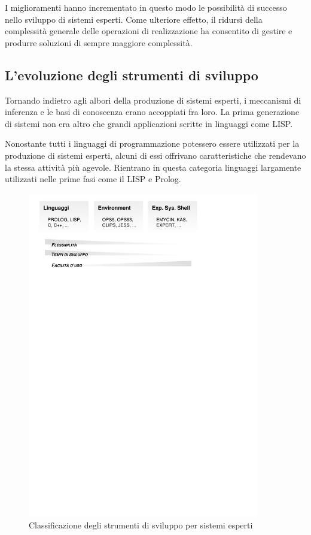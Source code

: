 I miglioramenti hanno incrementato in questo modo le possibilità di successo nello sviluppo di sistemi esperti. Come ulteriore effetto, il ridursi della complessità generale delle operazioni di realizzazione ha consentito di gestire e produrre soluzioni di sempre maggiore complessità.

\subsection{L'evoluzione degli strumenti di sviluppo}

Tornando indietro agli albori della produzione di sistemi esperti, i meccanismi di inferenza e le basi di conoscenza erano accoppiati fra loro. La prima generazione di sistemi non era altro che grandi applicazioni scritte in linguaggi come LISP.~\cite{knowbel1993} 

Nonostante tutti i linguaggi di programmazione potessero essere utilizzati per la produzione di sistemi esperti, alcuni di essi offrivano caratteristiche che rendevano la stessa attività più agevole. Rientrano in questa categoria linguaggi largamente utilizzati nelle prime fasi come il LISP e Prolog. 

\begin{figure}
\centering
\includegraphics[width=0.9\textwidth, viewport=28 650 440 824]{Immagini/Capitolo1/Classificazione-tools.pdf}
\caption{Classificazione degli strumenti di sviluppo per sistemi esperti}\label{fig:classificazione-tools}
\end{figure}


